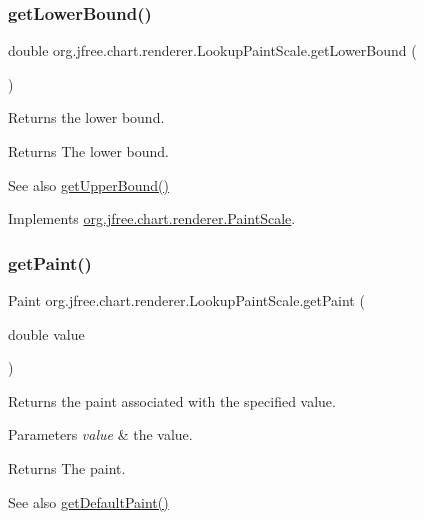 \subsubsection{\texorpdfstring{get\+Lower\+Bound()}{getLowerBound()}}
{\footnotesize\ttfamily double org.\+jfree.\+chart.\+renderer.\+Lookup\+Paint\+Scale.\+get\+Lower\+Bound (\begin{DoxyParamCaption}{ }\end{DoxyParamCaption})}

Returns the lower bound.

\begin{DoxyReturn}{Returns}
The lower bound.
\end{DoxyReturn}
\begin{DoxySeeAlso}{See also}
\mbox{\hyperlink{classorg_1_1jfree_1_1chart_1_1renderer_1_1_lookup_paint_scale_ad7956f5f6498550f77ce5c7ed8f22583}{get\+Upper\+Bound()}} 
\end{DoxySeeAlso}


Implements \mbox{\hyperlink{interfaceorg_1_1jfree_1_1chart_1_1renderer_1_1_paint_scale_a125f1d305abf1f3764b62f5a9c5fabbd}{org.\+jfree.\+chart.\+renderer.\+Paint\+Scale}}.

\mbox{\label{classorg_1_1jfree_1_1chart_1_1renderer_1_1_lookup_paint_scale_a8a1dcf9c72f6844f8a0aee28b98e4134}} 
\subsubsection{\texorpdfstring{get\+Paint()}{getPaint()}}
{\footnotesize\ttfamily Paint org.\+jfree.\+chart.\+renderer.\+Lookup\+Paint\+Scale.\+get\+Paint (\begin{DoxyParamCaption}\item[{double}]{value }\end{DoxyParamCaption})}

Returns the paint associated with the specified value.


\begin{DoxyParams}{Parameters}
{\em value} & the value.\\
\hline
\end{DoxyParams}
\begin{DoxyReturn}{Returns}
The paint.
\end{DoxyReturn}
\begin{DoxySeeAlso}{See also}
\mbox{\hyperlink{classorg_1_1jfree_1_1chart_1_1renderer_1_1_lookup_paint_scale_ab0716e02714ce29375ca366aa76e65fa}{get\+Default\+Paint()}} 
\end{DoxySeeAlso}


